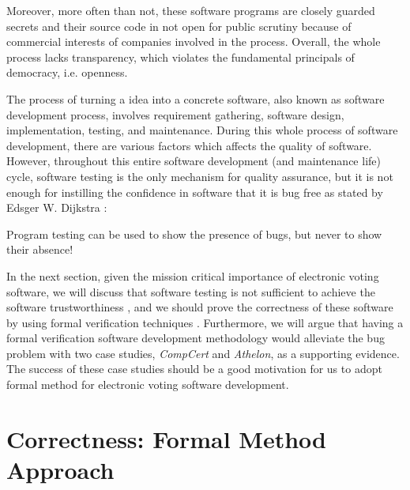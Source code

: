    \noindent 
   Moreover, more often than not, these software programs
   are closely guarded secrets and their source 
   code in not open for public scrutiny because of commercial 
   interests of companies \citep{AEC:2013:LMM} involved in the 
   process.  Overall, the whole process lacks transparency, which 
   violates the fundamental principals of democracy, i.e. openness. 
  
   The process  of turning a  idea into a 
   concrete software, also known as software development process, involves 
   requirement gathering, software design, implementation, testing, and maintenance. 
   During this whole process of software development, there are various factors 
   which affects the quality of software.  However, 
   throughout this entire software development (and maintenance life) cycle,
   software testing is the only mechanism for quality assurance, but
   it is not enough for 
   instilling the confidence in software that it is bug free 
   as stated by Edsger W. Dijkstra \citep{Dijkstra:1972:HP:355604.361591}:
   \begin{displayquote}
   Program testing can be used to show the presence of bugs, 
    but never to show their absence!
   \end{displayquote}
  
   
   In the next section, given the mission critical importance of electronic voting software, 
   we will discuss that software testing 
   is not sufficient to achieve the software trustworthiness \citep{10.1007/978-3-642-35795-4_5},  and we should 
   prove the  correctness of these software
   by using formal verification techniques \citep{BECKERT2014115}.
   Furthermore, we will argue that  having a formal verification software development methodology \citep{10.1007/978-3-319-95582-7_38}
    would alleviate 
	the bug problem with two case studies, \textit{CompCert} and \textit{Athelon}, as a supporting evidence. The success of these 
	case studies should be a good motivation for us to adopt formal method for electronic voting software development. 
   
   
   \section{Correctness: Formal Method Approach}
   \label{secback:correctness_formal}

